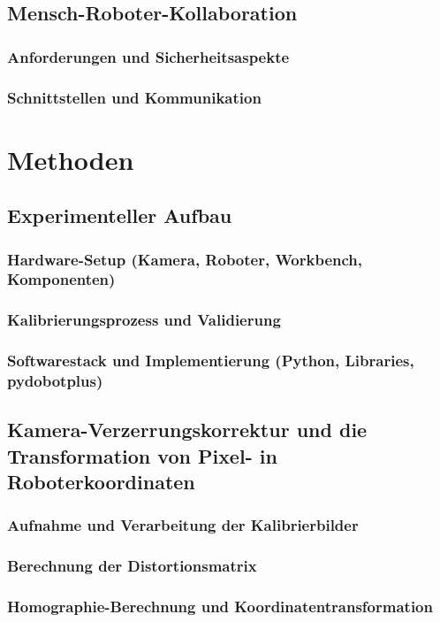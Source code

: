 \documentclass[12pt]{article}
\begin{document}
\subsection{Mensch-Roboter-Kollaboration}
    \subsubsection{Anforderungen und Sicherheitsaspekte}
    \subsubsection{Schnittstellen und Kommunikation}


\newpage


\section{Methoden}
\subsection{Experimenteller Aufbau}
    \subsubsection{Hardware-Setup (Kamera, Roboter, Workbench, Komponenten)}
    \subsubsection{Kalibrierungsprozess und Validierung}
    \subsubsection{Softwarestack und Implementierung (Python, Libraries, pydobotplus)}

\subsection{Kamera-Verzerrungskorrektur und die Transformation von Pixel- in Roboterkoordinaten}
    \subsubsection{Aufnahme und Verarbeitung der Kalibrierbilder}
    \subsubsection{Berechnung der Distortionsmatrix}
    \subsubsection{Homographie-Berechnung und Koordinatentransformation}
\end{document}
